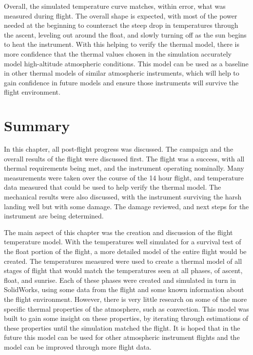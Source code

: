 Overall, the simulated temperature curve matches, within error, what was measured during flight. The overall shape is expected, with most of the power needed at the beginning to counteract the steep drop in temperatures through the ascent, leveling out around the float, and slowly turning off as the sun begins to heat the instrument. With this helping to verify the thermal model, there is more confidence that the thermal values chosen in the simulation accurately model high-altitude atmospheric conditions. This model can be used as a baseline in other thermal models of similar atmospheric instruments, which will help to gain confidence in future models and ensure those instruments will survive the flight environment.

\section{Summary}
In this chapter, all post-flight progress was discussed. The campaign and the overall results of the flight were discussed first. The flight was a success, with all thermal requirements being met, and the instrument operating nominally. Many measurements were taken over the course of the 14 hour flight, and temperature data measured that could be used to help verify the thermal model. The mechanical results were also discussed, with the instrument surviving the harsh landing well but with some damage. The damage reviewed, and next steps for the instrument are being determined.

The main aspect of this chapter was the creation and discussion of the flight temperature model. With the temperatures well simulated for a survival test of the float portion of the flight, a more detailed model of the entire flight would be created. The temperatures measured were used to create a thermal model of all stages of flight that would match the temperatures seen at all phases, of ascent, float, and sunrise. Each of these phases were created and simulated in turn in SolidWorks, using some data from the flight and some known information about the flight environment. However, there is very little research on some of the more specific thermal properties of the atmosphere, such as convection. This model was built to gain some insight on these properties, by iterating through estimations of these properties until the simulation matched the flight. It is hoped that in the future this model can be used for other atmospheric instrument flights and the model can be improved through more flight data.

